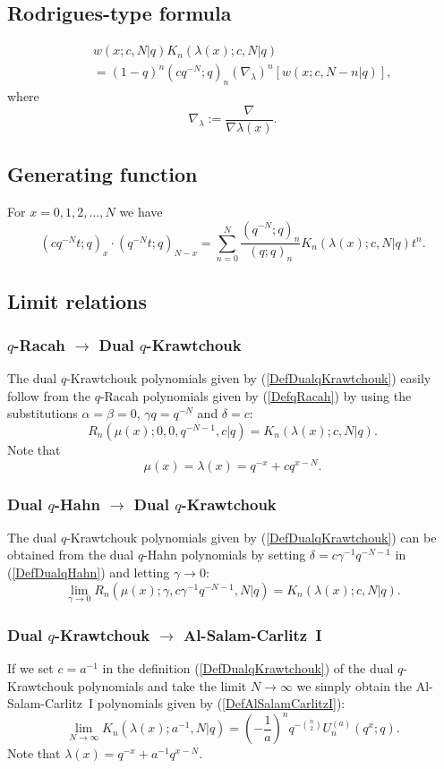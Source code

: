\documentclass[envcountchap,graybox]{svmono}
\newcounter{rom}
\begin{document}
\subsection*{Rodrigues-type formula}
\begin{eqnarray}
\label{RodDualqKrawtchouk}
& &w(x;c,N|q)K_n(\lambda(x);c,N|q)\nonumber\\
& &{}=(1-q)^n(cq^{-N};q)_n\left(\nabla_{\lambda}\right)^n\left[w(x;c,N-n|q)\right],
\end{eqnarray}
where
$$\nabla_{\lambda}:=\frac{\nabla}{\nabla\lambda(x)}.$$

\subsection*{Generating function} For $x=0,1,2,\ldots,N$ we have
\begin{equation}
\label{GenDualqKrawtchouk}
(cq^{-N}t;q)_x\cdot (q^{-N}t;q)_{N-x}=\sum_{n=0}^N
\frac{(q^{-N};q)_n}{(q;q)_n}K_n(\lambda(x);c,N|q)t^n.
\end{equation}

\subsection*{Limit relations}

\subsubsection*{$q$-Racah $\rightarrow$ Dual $q$-Krawtchouk}
The dual $q$-Krawtchouk polynomials given by (\ref{DefDualqKrawtchouk}) easily
follow from the $q$-Racah polynomials given by (\ref{DefqRacah}) by using the
substitutions $\alpha=\beta=0$, $\gamma q=q^{-N}$ and $\delta=c$:
$$R_n(\mu(x);0,0,q^{-N-1},c|q)=K_n(\lambda(x);c,N|q).$$
Note that
$$\mu(x)=\lambda(x)=q^{-x}+cq^{x-N}.$$

\subsubsection*{Dual $q$-Hahn $\rightarrow$ Dual $q$-Krawtchouk}
The dual $q$-Krawtchouk polynomials given by (\ref{DefDualqKrawtchouk}) can
be obtained from the dual $q$-Hahn polynomials by setting $\delta=c\gamma^{-1}q^{-N-1}$
in (\ref{DefDualqHahn}) and letting $\gamma\rightarrow 0$:
$$\lim_{\gamma\rightarrow 0}
R_n(\mu(x);\gamma,c\gamma^{-1}q^{-N-1},N|q)=K_n(\lambda(x);c,N|q).$$

\subsubsection*{Dual $q$-Krawtchouk $\rightarrow$ Al-Salam-Carlitz~I}
If we set $c=a^{-1}$ in the definition (\ref{DefDualqKrawtchouk})
of the dual $q$-Krawtchouk polynomials and take the limit
$N\rightarrow\infty$ we simply obtain the Al-Salam-Carlitz~I polynomials
given by (\ref{DefAlSalamCarlitzI}):
\begin{equation}
\lim_{N\rightarrow\infty}K_n(\lambda(x);a^{-1},N|q)=
\left(-\frac{1}{a}\right)^nq^{-\binom{n}{2}}U_n^{(a)}(q^x;q).
\end{equation}
Note that $\lambda(x)=q^{-x}+a^{-1}q^{x-N}$.
\end{document}
